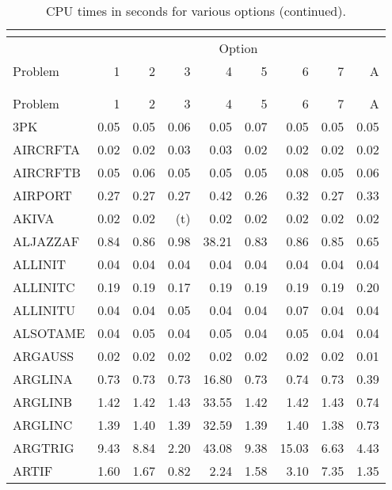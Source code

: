 \documentclass[11pt,twoside]{article}
\begin{document}
\setlength{\LTcapwidth}{5in}
\newpage
\setlongtables
{\small
\begin{longtable}[c]{|l|r|r|r|r|r|r|r|r|}
\caption{\label{t1} CPU times in seconds for various options.} \\
\multicolumn{9}{c}{$ $} \\ \hline
          &  \multicolumn{8}{c|}{Option}  \\
Problem   & 1 & 2 & 3 & 4 & 5 & 6 & 7 & A \\
\hline
\endfirsthead
\caption{CPU times in seconds for various options (continued).}  \\
\multicolumn{9}{c}{$ $} \\
\hline
Problem   & 1 & 2 & 3 & 4 & 5 & 6 & 7 & A \\
\hline
\endhead
\hline
\endfoot
\hline
\endlastfoot
3PK & 0.05 & 0.05 & 0.06 & 0.05 & 0.07 & 0.05 & 0.05 & 0.05 \\
AIRCRFTA & 0.02 & 0.02 & 0.03 & 0.03 & 0.02 & 0.02 & 0.02 & 0.02 \\
AIRCRFTB & 0.05 & 0.06 & 0.05 & 0.05 & 0.05 & 0.08 & 0.05 & 0.06 \\
AIRPORT & 0.27 & 0.27 & 0.27 & 0.42 & 0.26 & 0.32 & 0.27 & 0.33 \\
AKIVA & 0.02 & 0.02 & (t) & 0.02 & 0.02 & 0.02 & 0.02 & 0.02 \\
ALJAZZAF & 0.84 & 0.86 & 0.98 & 38.21 & 0.83 & 0.86 & 0.85 & 0.65 \\
ALLINIT & 0.04 & 0.04 & 0.04 & 0.04 & 0.04 & 0.04 & 0.04 & 0.04 \\
ALLINITC & 0.19 & 0.19 & 0.17 & 0.19 & 0.19 & 0.19 & 0.19 & 0.20 \\
ALLINITU & 0.04 & 0.04 & 0.05 & 0.04 & 0.04 & 0.07 & 0.04 & 0.04 \\
ALSOTAME & 0.04 & 0.05 & 0.04 & 0.05 & 0.04 & 0.05 & 0.04 & 0.04 \\
ARGAUSS & 0.02 & 0.02 & 0.02 & 0.02 & 0.02 & 0.02 & 0.02 & 0.01 \\
ARGLINA & 0.73 & 0.73 & 0.73 & 16.80 & 0.73 & 0.74 & 0.73 & 0.39 \\
ARGLINB & 1.42 & 1.42 & 1.43 & 33.55 & 1.42 & 1.42 & 1.43 & 0.74 \\
ARGLINC & 1.39 & 1.40 & 1.39 & 32.59 & 1.39 & 1.40 & 1.38 & 0.73 \\
ARGTRIG & 9.43 & 8.84 & 2.20 & 43.08 & 9.38 & 15.03 & 6.63 & 4.43 \\
ARTIF & 1.60 & 1.67 & 0.82 & 2.24 & 1.58 & 3.10 & 7.35 & 1.35 \\

\end{longtable}}
\end{document}
